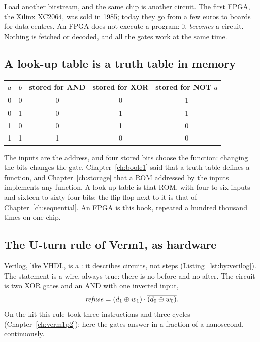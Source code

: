 Load another bitstream, and the same chip is another circuit. The first FPGA,
the Xilinx XC2064, was sold in 1985; today they go from a few euros to boards
for data centres. An FPGA does not execute a program: it \emph{becomes} a
circuit. Nothing is fetched or decoded, and all the gates work at the same
time.

\subsection{A look-up table is a truth table in memory}

\begin{center}\small\ttfamily
\begin{tabular}{cc|ccc}
\textrm{$a$}&\textrm{$b$}&\textrm{stored for AND}&\textrm{stored for XOR}&\textrm{stored for NOT $a$}\\\hline
0&0&0&0&1\\0&1&0&1&1\\1&0&0&1&0\\1&1&1&0&0
\end{tabular}
\end{center}

The inputs are the address, and four stored bits choose the function:
changing the bits changes the gate. Chapter~\ref{ch:boole1} said that a
truth table defines a function, and Chapter~\ref{ch:storage} that a ROM
addressed by the inputs implements any function. A look-up table is that
ROM, with four to six inputs and sixteen to sixty-four bits; the flip-flop
next to it is that of Chapter~\ref{ch:sequential}. An FPGA is this book,
repeated a hundred thousand times on one chip.

\subsection{The U-turn rule of Verm1, as hardware}



Verilog, like VHDL, is a : it describes
circuits, not steps (Listing~\ref{lst:by:verilog}). The statement
 is a wire, always true: there is no before and no after. The
circuit is two XOR gates and an AND with one inverted input,
\[ \mathit{refuse}=(d_1\oplus w_1)\cdot\overline{(d_0\oplus w_0)} . \]
On the kit this rule took three instructions and three cycles
(Chapter~\ref{ch:verm1p2}); here the gates answer in a fraction of a
nanosecond, continuously.

